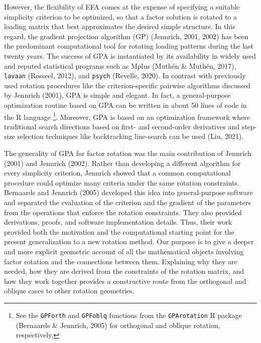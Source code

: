 \documentclass[
  12pt,
  letterpaper,
  article]{scrartcl}
\begin{document}
However, the flexibility of EFA comes at the expense of specifying a
suitable simplicity criterion to be optimized, so that a factor solution
is rotated to a loading matrix that best approximates the desired simple
structure. In this regard, the gradient projection algorithm (GP)
(Jennrich, 2001, 2002) has been the predominant computational tool for
rotating loading patterns during the last twenty years. The success of
GPA is instantiated by its availability in widely used and reputed
statistical programs such as Mplus (Muthén \& Muthén, 2017),
\texttt{lavaan} (Rosseel, 2012), and \texttt{psych} (Revelle, 2020). In
contrast with previously used rotation procedures like the
criterion-specific pairwise algorithms discussed by Jennrich (2001), GPA
is simple and elegant. In fact, a general-purpose optimization routine
based on GPA can be written in about 50 lines of code in the R language
\footnote{See the \texttt{GPForth} and \texttt{GPFoblq} functions from
  the \texttt{GPArotation} R package (Bernaards \& Jennrich, 2005) for
  orthogonal and oblique rotation, respectively.}. Moreover, GPA is
based on an optimization framework where traditional search directions
based on first- and second-order derivatives and step-size selection
techniques like backtracking line-search can be used (Liu, 2021).

The generality of GPA for factor rotation was the main contribution of
Jennrich (2001) and Jennrich (2002). Rather than developing a different
algorithm for every simplicity criterion, Jennrich showed that a common
computational procedure could optimize many criteria under the same
rotation constraints. Bernaards and Jennrich (2005) developed this idea
into general-purpose software and separated the evaluation of the
criterion and the gradient of the parameters from the operations that
enforce the rotation constraints. They also provided derivations,
proofs, and software implementation details. Thus, their work provided
both the motivation and the computational starting point for the present
generalization to a new rotation method. Our purpose is to give a deeper
and more explicit geometric account of all the mathematical objects
involving factor rotation and the connections between them. Explaining
why they are needed, how they are derived from the constraints of the
rotation matrix, and how they work together provides a constructive
route from the orthogonal and oblique cases to other rotation
geometries.
\end{document}
